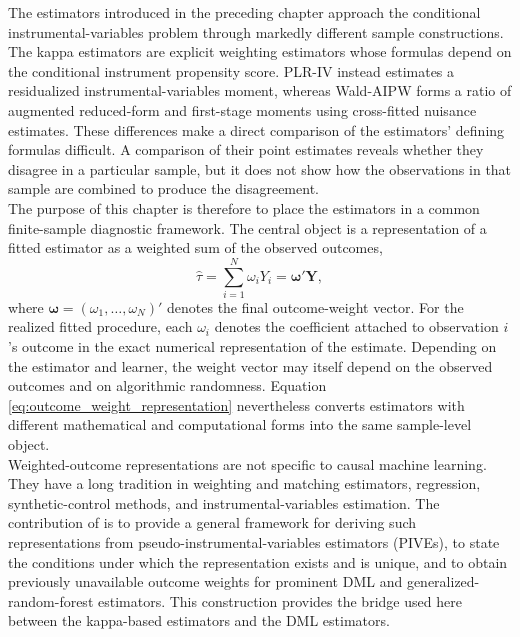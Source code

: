 \documentclass[12pt, a4paper, oneside]{article}
\theoremstyle{plain}
\theoremstyle{definition}
\begin{document}
The estimators introduced in the preceding chapter approach the conditional
instrumental-variables problem through markedly different sample constructions.
The kappa estimators are explicit weighting estimators whose formulas depend on
the conditional instrument propensity score. PLR-IV instead estimates a
residualized instrumental-variables moment, whereas Wald-AIPW forms a ratio of
augmented reduced-form and first-stage moments using cross-fitted nuisance
estimates. These differences make a direct comparison of the estimators' defining
formulas difficult. A comparison of their point estimates reveals whether they
disagree in a particular sample, but it does not show how the observations in
that sample are combined to produce the disagreement.\\
The purpose of this chapter is therefore to place the estimators in a common
finite-sample diagnostic framework. The central object is a representation of a
fitted estimator as a weighted sum of the observed outcomes,
\begin{equation}
    \widehat{\tau}
    = \sum_{i=1}^{N}\omega_iY_i
    = \boldsymbol{\omega}'\mathbf{Y},
    \label{eq:outcome_weight_representation}
\end{equation}
where \(\boldsymbol{\omega}=(\omega_1,\ldots,\omega_N)'\) denotes the final
outcome-weight vector. For the realized fitted procedure, each \(\omega_i\) denotes the coefficient
attached to observation \(i\)'s outcome in the exact numerical representation
of the estimate. Depending on the estimator and learner, the weight vector may itself
depend on the observed outcomes and on algorithmic randomness. Equation
\eqref{eq:outcome_weight_representation} nevertheless converts estimators with
different mathematical and computational forms into the same sample-level
object.\\
Weighted-outcome representations are not specific to causal machine learning.
They have a long tradition in weighting and matching estimators, regression,
synthetic-control methods, and instrumental-variables estimation. The
contribution of \citet{knaus2024treatment} is to provide a general framework for
deriving such representations from pseudo-instrumental-variables estimators
(PIVEs), to state the conditions under which the representation exists and is
unique, and to obtain previously unavailable outcome weights for prominent DML
and generalized-random-forest estimators. This construction provides the bridge
used here between the kappa-based estimators and the DML estimators.
\end{document}
